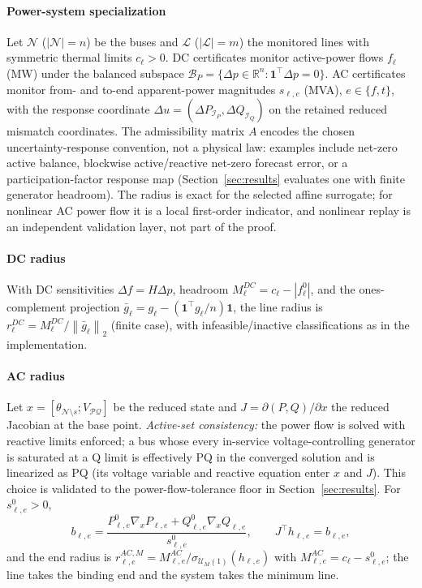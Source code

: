 \documentclass[11pt]{article}
\newcommand{\R}{\mathbb{R}}
\newcommand{\ones}{\mathbf{1}}
\newcommand{\norm}[1]{\left\lVert #1 \right\rVert}
\newcommand{\abs}[1]{\left\lvert #1 \right\rvert}
\begin{document}
\paragraph{Power-system specialization}
Let $\mathcal{N}$ ($|\mathcal{N}|=n$) be the buses and $\mathcal{L}$
($|\mathcal{L}|=m$) the monitored lines with symmetric thermal limits
$c_\ell>0$.  DC certificates monitor active-power flows $f_\ell$ (MW) under
the balanced subspace
$\mathcal{B}_P=\{\Delta p\in\R^n:\ones^\top\Delta p=0\}$.  AC certificates
monitor from- and to-end apparent-power magnitudes $s_{\ell,e}$ (MVA),
$e\in\{f,t\}$, with the response coordinate
$\Delta u=(\Delta P_{\mathcal{I}_P},\Delta Q_{\mathcal{I}_Q})$ on the
retained reduced mismatch coordinates.  The admissibility matrix $A$
encodes the chosen uncertainty-response convention, not a physical law:
examples include net-zero active balance, blockwise active/reactive
net-zero forecast error, or a participation-factor response map
(Section~\ref{sec:results} evaluates one with finite generator headroom).
The radius is exact for the selected affine surrogate; for nonlinear AC
power flow it is a local first-order indicator, and nonlinear replay is an
independent validation layer, not part of the proof.

\paragraph{DC radius}
With DC sensitivities $\Delta f=H\Delta p$, headroom
$M_\ell^{DC}=c_\ell-\abs{f_\ell^0}$, and the ones-complement projection
$\bar g_\ell=g_\ell-(\ones^\top g_\ell/n)\ones$, the line radius is
$r_\ell^{DC}=M_\ell^{DC}/\norm{\bar g_\ell}_2$ (finite case), with
infeasible/inactive classifications as in the implementation.

\paragraph{AC radius}
Let $x=[\theta_{\mathcal{N}\setminus s};V_{\mathcal{PQ}}]$ be the reduced
state and $J=\partial(P,Q)/\partial x$ the reduced Jacobian at the base
point.  \emph{Active-set consistency:} the power flow is solved with
reactive limits enforced; a bus whose every in-service voltage-controlling
generator is saturated at a Q limit is effectively PQ in the converged
solution and is linearized as PQ (its voltage variable and reactive
equation enter $x$ and $J$).  This choice is validated to the
power-flow-tolerance floor in Section~\ref{sec:results}.  For
$s^0_{\ell,e}>0$,
\begin{equation}
  b_{\ell,e}=\frac{P^0_{\ell,e}\nabla_x P_{\ell,e}
  +Q^0_{\ell,e}\nabla_x Q_{\ell,e}}{s^0_{\ell,e}},
  \qquad
  J^\top h_{\ell,e}=b_{\ell,e},
\end{equation}
and the end radius is $r^{AC,M}_{\ell,e}=M^{AC}_{\ell,e}/
\sigma_{\mathcal{U}_M(1)}(h_{\ell,e})$ with
$M^{AC}_{\ell,e}=c_\ell-s^0_{\ell,e}$; the line takes the binding end and
the system takes the minimum line.
\end{document}
